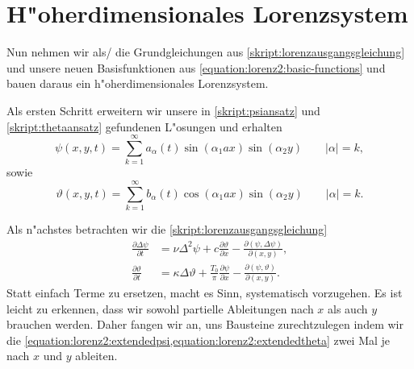 \section{H"oherdimensionales Lorenzsystem\label{section:lorenz2:ho-model}}
Nun nehmen wir als/ die Grundgleichungen aus 
\cref{skript:lorenzausgangsgleichung} und unsere neuen Basisfunktionen aus 
\cref{equation:lorenz2:basic-functions} und bauen daraus ein 
h"oherdimensionales Lorenzsystem.

Als ersten Schritt erweitern wir unsere in \cref{skript:psiansatz} und 
\cref{skript:thetaansatz} gefundenen L"osungen und erhalten
\begin{equation}
\psi(x,y,t) =
\sum_{k = 1}^{\infty}
a_{\alpha}(t)
\sin(\alpha_1 ax) \sin(\alpha_2 y)
\qquad |\alpha| = k,
\label{equation:lorenz2:extendedpsi}
\end{equation}
sowie
\begin{equation}
\vartheta(x,y,t) =
\sum_{k = 1}^{\infty}
b_{\alpha}(t)
\cos(\alpha_1 ax) \sin(\alpha_2 y)
\qquad |\alpha| = k.
\label{equation:lorenz2:extendedtheta}
\end{equation}

Als n"achstes betrachten wir die \cref{skript:lorenzausgangsgleichung}
\begin{align*}
\frac{\partial\Delta\psi}{\partial t}
&=
\nu\Delta^2\psi 
+c\frac{\partial\vartheta}{\partial x}
-\frac{\partial(\psi,\Delta\psi)}{\partial(x,y)},
\\
\frac{\partial\vartheta}{\partial t}
&=
\kappa\Delta\vartheta
+ \frac{T_0}{\pi}\frac{\partial\psi}{\partial x}
- \frac{\partial(\psi,\vartheta)}{\partial(x,y)}.
\end{align*}
Statt einfach Terme zu ersetzen, macht es Sinn, systematisch vorzugehen. Es ist 
leicht zu erkennen, dass wir sowohl partielle Ableitungen nach $x$ als auch $y$ 
brauchen werden. Daher fangen wir an, uns Bausteine zurechtzulegen indem wir 
die \cref{equation:lorenz2:extendedpsi,equation:lorenz2:extendedtheta} 
zwei Mal je nach $x$ und $y$ ableiten.

